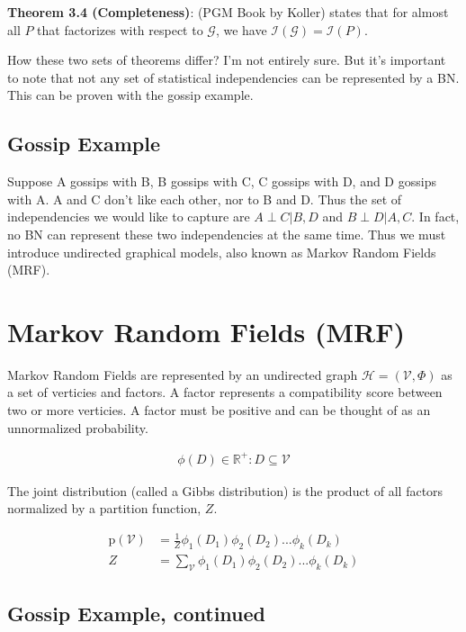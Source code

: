 \documentclass[11pt]{article}
\newcommand{\ProbOpr}[1]{\mathbb{#1}} %
\newcommand{\SetOf}[1]{\mathbf{#1}} %
\newcommand{\prob}[1]{\text{p}(#1)} %
\newcommand{\Eq}[1]{\begin{align*}#1\end{align*}} %
\newcommand{\boldFace}[1]{\textbf{#1}} %
\newcommand{\cursive}[1]{\mathcal{#1}}
\begin{document}
	\boldFace{Theorem 3.4 (Completeness)}: (PGM Book by Koller) states that for almost all $P$ that factorizes with respect to $\cursive{G}$, we have $\cursive{I}(\cursive{G}) = \cursive{I}(P)$.

	How these two sets of theorems differ? I'm not entirely sure. %
	But it's important to note that not any set of statistical independencies can be represented by a BN. This can be proven with the gossip example.

	\subsection{Gossip Example}
	Suppose A gossips with B, B gossips with C, C gossips with D, and D gossips with A. A and C don't like each other, nor to B and D. Thus the set of independencies we would like to capture are $A \perp C|B,D$ and $B \perp D | A,C$. In fact, no BN can represent these two independencies at the same time. Thus we must introduce undirected graphical models, also known as Markov Random Fields (MRF).

\section{Markov Random Fields (MRF)}
	Markov Random Fields are represented by an undirected graph $\cursive{H} = (\cursive{V},\Phi)$ as a set of verticies and factors. A factor represents a compatibility score between two or more verticies. A factor must be positive and can be thought of as an unnormalized probability. 

	\Eq{\phi(D) \in \ProbOpr{R}^+ : D \subseteq \cursive{V}}

	The joint distribution (called a Gibbs distribution) is the product of all factors normalized by a partition function, $Z$.

	\Eq{\prob{\cursive{V}} &= \frac{1}{Z}\phi_1(D_1)\phi_2(D_2)...\phi_k(D_k)\\Z&=\sum_{\cursive{V}}\phi_1(D_1)\phi_2(D_2)...\phi_k(D_k)}


	\subsection{Gossip Example, continued}

	\begin{center}
	\end{center}
\end{document}
